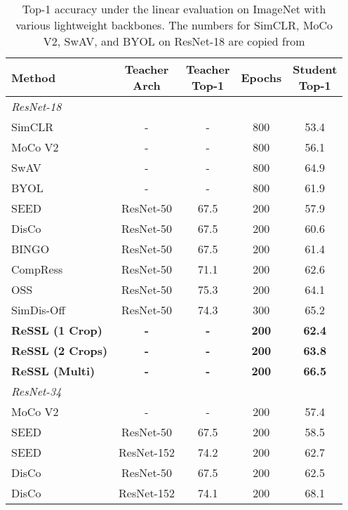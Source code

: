 \documentclass{article}
\newcommand{\<}{\left\langle}
\renewcommand{\>}{\right\rangle}
\begin{document}
\renewcommand\arraystretch{1.0}
\begin{table}[h]
 \setlength\tabcolsep{5pt}
 \centering
 \caption{Top-1 accuracy under the linear evaluation on ImageNet with various lightweight backbones. The numbers for SimCLR, MoCo V2, SwAV, and BYOL on ResNet-18 are copied from \cite{oss}}
 \label{table:lightweight}
 \vspace{-10pt}
\begin{tabular}{l c c c c}
\toprule 
Method &  \makecell{Teacher\\Arch}  & \makecell{Teacher\\Top-1}  & Epochs & \makecell{Student\\Top-1} \\ \hline
\emph{ResNet-18} \\
SimCLR \cite{simclr} & - & - & 800 & 53.4 \\
MoCo V2 \cite{moco} & - & - & 800 & 56.1 \\
SwAV \cite{swav} & - & - & 800 & 64.9 \\
BYOL \cite{byol} & - & - & 800 & 61.9 \\
SEED \cite{seed} & ResNet-50 & 67.5 & 200 & 57.9 \\
DisCo \cite{disco} & ResNet-50 & 67.5 & 200 & 60.6 \\
BINGO \cite{bingo} & ResNet-50 & 67.5 & 200 & 61.4 \\
CompRess \cite{compress} & ResNet-50 & 71.1 & 200 & 62.6 \\
OSS \cite{oss} & ResNet-50 & 75.3 & 200 & 64.1 \\
SimDis-Off \cite{oss} & ResNet-50 & 74.3 & 300 & 65.2 \\ 
\textbf{ReSSL (1 Crop)}  & \textbf{-} & \textbf{-} & \textbf{200} & \textbf{62.4} \\ 
\textbf{ReSSL (2 Crops)} & \textbf{-} & \textbf{-} & \textbf{200} & \textbf{63.8} \\ 
\textbf{ReSSL (Multi)}   & \textbf{-} & \textbf{-} & \textbf{200} & \textbf{66.5} \\ 
\bottomrule
\emph{ResNet-34} \\
MoCo V2 \cite{mocov2} & - & - & 200 & 57.4 \\
SEED \cite{seed} & ResNet-50 & 67.5 & 200 & 58.5 \\
SEED \cite{seed} & ResNet-152 & 74.2 & 200 & 62.7 \\
DisCo \cite{disco} & ResNet-50 & 67.5 & 200 & 62.5 \\
DisCo \cite{disco} & ResNet-152 & 74.1 & 200 & 68.1 \\

\end{tabular}
\end{table}
\end{document}
